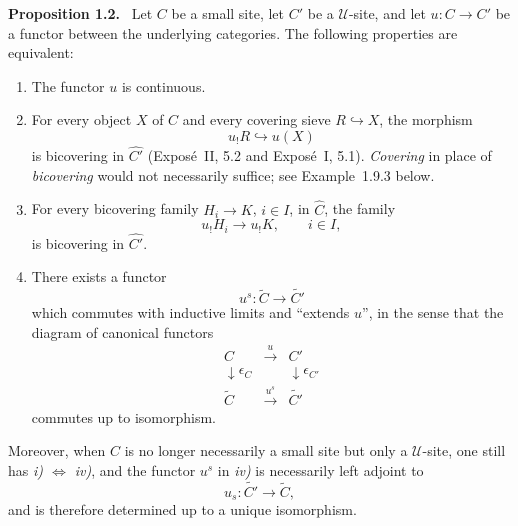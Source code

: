 \documentclass[11pt]{article}
\newcommand{\U}{\mathcal{U}}
\newenvironment{statement}[1]{\par\medskip\noindent\textbf{#1.}\ }{\par\medskip}
\begin{document}
\begin{statement}{Proposition 1.2}
Let \(C\) be a small site, let \(C'\) be a \(\U\)-site, and let \(u:C\to C'\) be a functor between the underlying categories. The following properties are equivalent:
\begin{enumerate}[label=\roman*)]
\item The functor \(u\) is continuous.
\item For every object \(X\) of \(C\) and every covering sieve \(R\hookrightarrow X\), the morphism
\[
u_!R\hookrightarrow u(X)
\]
is bicov\-ering in \(\widehat{C'}\) (Expos\'e~II, 5.2 and Expos\'e~I, 5.1). \emph{Covering} in place of \emph{bicov\-ering} would not necessarily suffice; see Example~1.9.3 below.
\item For every bicov\-ering family \(H_i\to K\), \(i\in I\), in \(\widehat C\), the family
\[
u_!H_i\to u_!K,
\qquad i\in I,
\]
is bicov\-ering in \(\widehat{C'}\).
\item There exists a functor
\[
u^s:\widetilde C\to\widetilde{C'}
\]
which commutes with inductive limits and ``extends \(u\)'', in the sense that the diagram of canonical functors
\[
\begin{array}{ccc}
C&\xrightarrow{u}&C'\\
\downarrow \epsilon_C&&\downarrow\epsilon_{C'}\\
\widetilde C&\xrightarrow{u^s}&\widetilde{C'}
\end{array}
\]
commutes up to isomorphism.
\end{enumerate}
Moreover, when \(C\) is no longer necessarily a small site but only a \(\U\)-site, one still has \emph{i) \(\Leftrightarrow\) iv)}, and the functor \(u^s\) in \emph{iv)} is necessarily left adjoint to
\[
u_s:\widetilde{C'}\to\widetilde C,
\]
and is therefore determined up to a unique isomorphism.
\end{statement}
\end{document}
